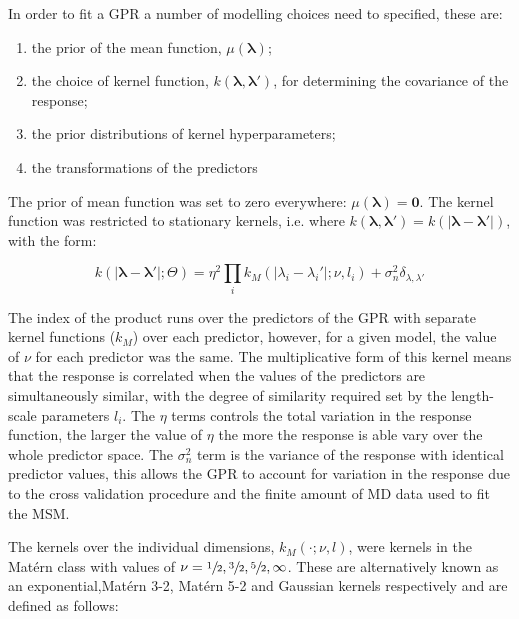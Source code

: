 In order to fit a GPR a number of modelling choices need to specified, these are: 
\begin{enumerate}
    \item the prior of the mean function, $\mu(\mathbf{\lambda})$;
    \item the choice of kernel function, $k(\mathbf{\lambda}, \mathbf{\lambda}')$, for determining the covariance of the response;
    \item the prior distributions of kernel hyperparameters;
    \item the transformations of the predictors 
\end{enumerate}

The prior of mean function  was set to zero everywhere: $\mu(\mathbf{\lambda})=\mathbf{0}$. The kernel function was restricted to stationary kernels, i.e. where $k(\mathbf{\lambda}, \mathbf{\lambda'}) = k(|\mathbf{\lambda} - \mathbf{\lambda'}|)$, with the form: 

\begin{equation}\label{eqn:kernel_form}
    k(|\mathbf{\lambda}-\mathbf{\lambda}'|; \Theta) = 
    \eta^{2}\prod_i k_{M}(|\lambda_{i}-\lambda_{i}'|; \nu, l_i)
    +\sigma_{n}^{2}\delta_{\lambda, \lambda'}
\end{equation}

The index of the product runs over the predictors of the GPR with separate kernel functions ($k_{M}$) over each predictor, however,  for a given model, the value of $\nu$ for each predictor was the same. The multiplicative form of this kernel means that the response is correlated when the values of the predictors are simultaneously similar, with the degree of similarity required set by the length-scale parameters $l_{i}$.  The $\eta$ terms controls the total variation in the response function, the larger the value of $\eta$ the more the response is able vary over the whole predictor space. The $\sigma_{n}^{2}$ term is the variance of the response with identical predictor values, this allows the GPR to account for variation in the response due to the cross validation procedure and the finite amount of MD data used to fit the MSM. 

The kernels over the individual dimensions, $k_{M}(\cdot; \nu, l)$, were kernels in the Mat\'{e}rn class with values of $\nu=\sfrac{1}{2},\sfrac{3}{2},\sfrac{5}{2},\infty$. These are alternatively known as an exponential,Mat\'{e}rn 3-2, Mat\'{e}rn 5-2 and  Gaussian kernels respectively and are defined as follows: 


